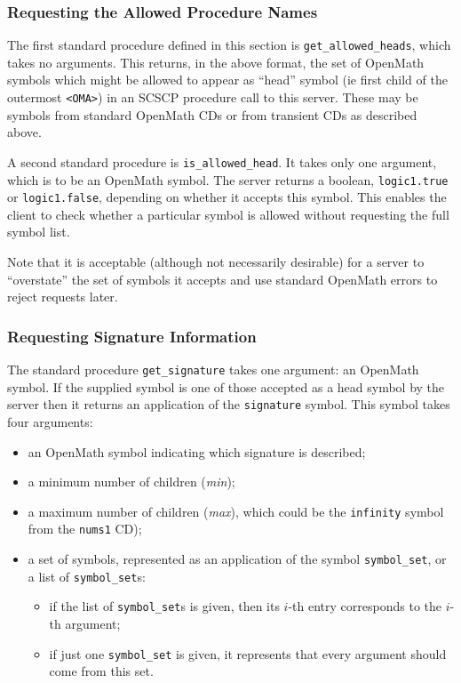\documentclass{amsart}
\begin{document}
\subsubsection{Requesting the Allowed Procedure Names}

The first standard procedure defined in this section is
\verb|get_allowed_heads|, which takes no arguments. 
This returns, in the above format, the set of
OpenMath symbols which might be allowed to appear as ``head'' symbol (ie
first child of the outermost \verb|<OMA>|) in an SCSCP procedure call to
this server. These may be symbols from standard OpenMath CDs or from
transient CDs as described above. 

A second standard procedure is \verb|is_allowed_head|. It takes only one
argument, which is to be an OpenMath symbol. The server returns a boolean,
\verb|logic1.true| or \verb|logic1.false|, depending on whether it accepts this
symbol. This enables the client to check whether a particular symbol is allowed
without requesting the full symbol list.

Note that it is acceptable (although
not necessarily desirable) for a server to
``overstate'' the set of symbols it accepts and use standard OpenMath
errors to reject requests later.

\subsubsection{Requesting Signature Information}

The standard procedure \verb|get_signature| takes one argument: an
OpenMath symbol. If the supplied symbol is one of those accepted as a
head symbol by the server then it returns an application of the \verb|signature|
symbol. This symbol takes four arguments: 
\begin{itemize}
\item an OpenMath symbol indicating which signature is described; 
\item a minimum number of children ({\it min}); 
\item a maximum number of children ({\it max}), 
      which could be the \verb|infinity| symbol from the \verb|nums1| CD); 
\item a set of symbols, represented as an application of the
      symbol \verb|symbol_set|, or a list of \verb|symbol_set|s:
\begin{itemize}
\item if the list of \verb|symbol_set|s is given, then its $i$-th entry
      corresponds to the $i$-th argument;
\item if just one \verb|symbol_set| is given, it represents that every argument
      should come from this set.
\end{itemize}
\end{itemize}
\end{document}
